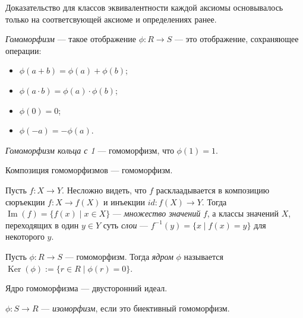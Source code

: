\documentclass[12pt,a4paper]{article}
\DeclareMathOperator{\Img}{Im}
\DeclareMathOperator{\Ker}{Ker}
\begin{document}
    \begin{remark}
        Доказательство для классов эквивалентности каждой аксиомы основывалось только на соответсвующей аксиоме и определениях ранее.
    \end{remark}

    \begin{definition}
        \emph{Гомоморфизм} --- такое отображение $\phi: R \to S$ --- это отображение, сохраняющее операции:
        \begin{itemize}
            \item $\phi(a + b) = \phi(a) + \phi(b)$;
            \item $\phi(a \cdot b) = \phi(a) \cdot \phi(b)$;
            \item $\phi(0) = 0$;
            \item $\phi(-a) = -\phi(a)$.
        \end{itemize}

        \emph{Гомоморфизм кольца с 1} --- гомоморфизм, что $\phi(1) = 1$.
    \end{definition}

    \begin{statement}
        Композиция гомоморфизмов --- гомоморфизм.
    \end{statement}

    \begin{definition}
        Пусть $f: X \to Y$. Несложно видеть, что $f$ расклаадывается в композицию сюръекции $f: X \to f(X)$ и инъекции $id: f(X) \to Y$. Тогда $\Img(f) = \{f(x) \mid x \in X\}$ --- \emph{множество значений} $f$, а классы значений $X$, переходящих в один $y\in Y$ суть \emph{слои} --- $f^{-1}(y) = \{x \mid f(x) = y\}$ для некоторого $y$.
    \end{definition}

    \begin{definition}
        Пусть $\phi: R \to S$ --- гомоморфизм. Тогда \emph{ядром} $\phi$ называется $\Ker(\phi) := \{r \in R \mid \phi(r) = 0\}$.
    \end{definition}

    \begin{statement}
        Ядро гомоморфизма --- двусторонний идеал.
    \end{statement}

    \begin{definition}
        $\phi: S \to R$ --- \emph{изоморфизм}, если это биективный гомоморфизм.
    \end{definition}
\end{document}
